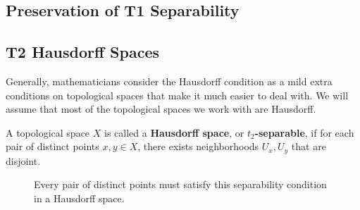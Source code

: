 \subsection{Preservation of T1 Separability}

\subsection{T2 Hausdorff Spaces}

  Generally, mathematicians consider the Hausdorff condition as a mild extra conditions on topological spaces that make it much easier to deal with. We will assume that most of the topological spaces we work with are Hausdorff. 

  \begin{definition}
    A topological space $X$ is called a \textbf{Hausdorff space}, or \textbf{$t_2$-separable}, if for each pair of distinct points $x, y \in X$, there exists neighborhoods $U_x, U_y$ that are disjoint.

    \begin{figure}[H]
      \centering 
      \caption{Every pair of distinct points must satisfy this separability condition in a Hausdorff space.} 
      \label{fig:hausdorff}
    \end{figure}
  \end{definition}


